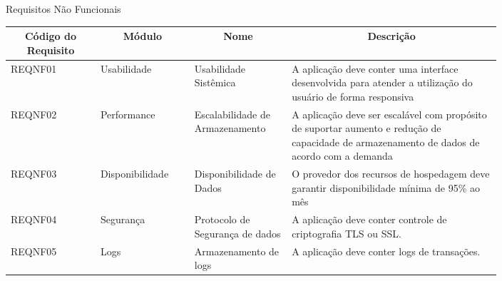     \begin{enumerate}
        \begin{quadro}[H]
        \centering\footnotesize
        \footnotesize
        \caption{Requisitos Não Funcionais}
        \label{requisitos-nao-funcionais}
            \begin{tabular}{|p{0.15\linewidth} | p{0.15\linewidth} | p{0.15\linewidth} | p{0.35\linewidth} |}  \hline
            \multicolumn{1}{|c|}{\textbf{Código do Requisito}} &
              \multicolumn{1}{c|}{\textbf{Módulo}} &
              \multicolumn{1}{c|}{\textbf{Nome}} &
              \multicolumn{1}{c|}{\textbf{Descrição}} \\ \hline
            REQNF01 &
              Usabilidade &
              Usabilidade Sistêmica &
              A aplicação deve conter uma interface desenvolvida para atender a utilização do usuário de forma responsiva \\ \hline
            REQNF02 &
              Performance &
              Escalabilidade de Armazenamento &
              A aplicação deve ser escalável com propósito de suportar aumento e redução de capacidade de armazenamento de dados de acordo com a demanda \\ \hline
            REQNF03 &
              Disponibilidade & Disponibilidade de Dados &
              O provedor dos recursos de hospedagem deve garantir disponibilidade mínima de 95\% ao mês \\ \hline
            REQNF04 &
              Segurança &
              Protocolo de Segurança de dados &
              A aplicação deve conter controle de criptografia TLS ou SSL.  \\ \hline
            REQNF05 &
              Logs &
              Armazenamento de logs &
              A aplicação deve conter logs de transações. \\ \hline
            \end{tabular}
        \end{quadro}
    \end{enumerate}
